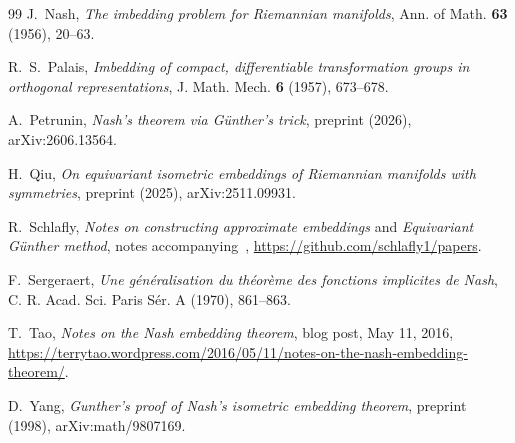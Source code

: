 \documentclass[11pt]{amsart}
\theoremstyle{definition}
\begin{document}
\begin{thebibliography}{99}
J.~Nash, \emph{The imbedding problem for Riemannian manifolds}, Ann. of Math. \textbf{63} (1956),
20--63.

R.~S.~Palais, \emph{Imbedding of compact, differentiable transformation groups in orthogonal
representations}, J. Math. Mech. \textbf{6} (1957), 673--678.

A.~Petrunin, \emph{Nash's theorem via G\"unther's trick}, preprint (2026), arXiv:2606.13564.

H.~Qiu, \emph{On equivariant isometric embeddings of Riemannian manifolds with symmetries},
preprint (2025), arXiv:2511.09931.

R.~Schlafly, \emph{Notes on constructing approximate embeddings} and \emph{Equivariant G\"unther
method}, notes accompanying~\cite{MS80}, \url{https://github.com/schlafly1/papers}.

F.~Sergeraert, \emph{Une g\'en\'eralisation du th\'eor\`eme des fonctions implicites de Nash},
C. R. Acad. Sci. Paris S\'er. A (1970), 861--863.

T.~Tao, \emph{Notes on the Nash embedding theorem}, blog post, May 11, 2016,
\url{https://terrytao.wordpress.com/2016/05/11/notes-on-the-nash-embedding-theorem/}.

D.~Yang, \emph{Gunther's proof of Nash's isometric embedding theorem}, preprint (1998),
arXiv:math/9807169.

\end{thebibliography}
\end{document}
